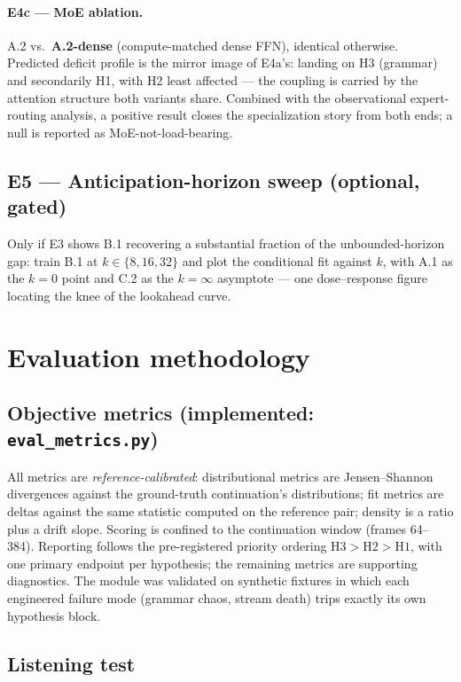 \documentclass[11pt]{article}
\newcommand{\sys}[1]{\textbf{#1}}
\newcommand{\code}[1]{\texttt{#1}}
\begin{document}
\paragraph{E4c --- MoE ablation.} A.2 vs.\ \sys{A.2-dense}
(compute-matched dense FFN), identical otherwise. Predicted deficit
profile is the mirror image of E4a's: landing on H3 (grammar) and
secondarily H1, with H2 least affected --- the coupling is carried by
the attention structure both variants share. Combined with the
observational expert-routing analysis, a positive result closes the
specialization story from both ends; a null is reported as
MoE-not-load-bearing.

\subsection{E5 --- Anticipation-horizon sweep (optional, gated)}

Only if E3 shows B.1 recovering a substantial fraction of the
unbounded-horizon gap: train B.1 at $k \in \{8, 16, 32\}$ and plot the
conditional fit against $k$, with A.1 as the $k{=}0$ point and C.2 as
the $k{=}\infty$ asymptote --- one dose--response figure locating the
knee of the lookahead curve.

\section{Evaluation methodology}

\subsection{Objective metrics (implemented: \code{eval\_metrics.py})}

All metrics are \emph{reference-calibrated}: distributional metrics
are Jensen--Shannon divergences against the ground-truth
continuation's distributions; fit metrics are deltas against the same
statistic computed on the reference pair; density is a ratio plus a
drift slope. Scoring is confined to the continuation window (frames
64--384). Reporting follows the pre-registered priority ordering
$\mathrm{H3} > \mathrm{H2} > \mathrm{H1}$, with one primary endpoint
per hypothesis; the remaining metrics are supporting diagnostics. The
module was validated on synthetic fixtures in which each engineered
failure mode (grammar chaos, stream death) trips exactly its own
hypothesis block.

\subsection{Listening test}
\end{document}
